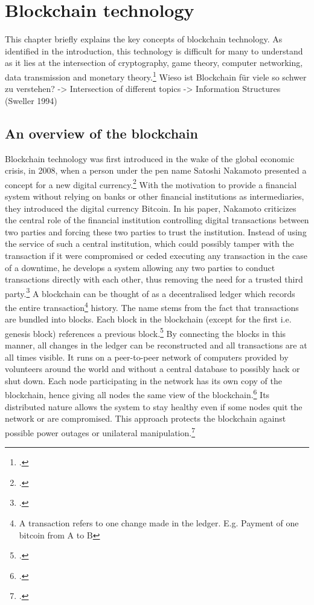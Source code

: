 \chapter{Blockchain technology}

This chapter briefly explains the key concepts of blockchain technology. As identified in the introduction, this technology is difficult for many to understand as it lies at the intersection of cryptography, game theory, computer networking, data transmission and monetary theory.\footcite[Cf.][]{LoppNobodyUnderstandsBitcoin2017}
Wieso ist Blockchain für viele so schwer zu verstehen? -> Intersection of different topics -> Information Structures (Sweller 1994)

\section{An overview of the blockchain} \label{sec:Blockchain}

Blockchain technology was first introduced in the wake of the global economic crisis, in 2008, when a person under the pen name Satoshi Nakamoto presented a concept for a new digital currency.\footcite[Cf.][]{Nakamoto.2008} With the motivation to provide a financial system without relying on banks or other financial institutions as intermediaries, they introduced the digital currency Bitcoin. In his paper, Nakamoto criticizes the central role of the financial institution controlling digital transactions between two parties and forcing these two parties to trust the institution. Instead of using the service of such a central institution, which could possibly tamper with the transaction if it were compromised or ceded executing any transaction in the case of a downtime, he develops a system allowing any two parties to conduct transactions directly with each other, thus removing the need for a trusted third party.\footcite[Cf.][p.2]{Nakamoto.2008} A blockchain can be thought of as a decentralised ledger which records the entire transaction\footnote{A transaction refers to one change made in the ledger. E.g. Payment of one bitcoin from A to B} history. The name stems from the fact that transactions are bundled into blocks. Each block in the blockchain (except for the first i.e. genesis block) references a previous block.\footcite[Cf.][chapter 1]{BashirMasteringBlockchain2017} By connecting the blocks in this manner, all changes in the ledger can be reconstructed and all transactions are at all times visible. It runs on a peer-to-peer network of computers provided by volunteers around the world and without a central database to possibly hack or shut down. Each node participating in the network has its own copy of the blockchain, hence giving all nodes the same view of the blockchain.\footcites[Cf.][p.5]{Tapscott.2017}[cf.][p.41]{Welzel.2017} Its distributed nature allows the system to stay healthy even if some nodes quit the network or are compromised. This approach protects the blockchain against possible power outages or unilateral manipulation.\footcite[Cf.][p.8]{Nakamoto.2008}

